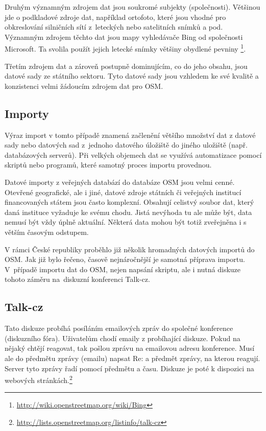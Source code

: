 Druhým významným zdrojem dat jsou soukromé subjekty (společnosti).
Většinou jde o podkladové zdroje dat, například ortofoto, které jsou
vhodné pro obkreslování silničních sítí z~leteckých nebo
satelitních snímků a pod.
Významným zdrojem těchto dat jsou mapy vyhledávače Bing od společnosti
Microsoft. Ta svolila použít jejich letecké snímky většiny
obydlené pevniny \footnote{\url{http://wiki.openstreetmap.org/wiki/Bing}}.

Třetím zdrojem dat a zároveň postupně dominujícím, co do jeho obsahu, jsou
datové sady ze státního sektoru. Tyto datové sady jsou vzhledem ke své kvalitě a konzistenci velmi žádoucím zdrojem
dat pro OSM.

\subsection{Importy}
\label{Importy}
Výraz import v tomto případě znamená začlenění většího množství dat z datové sady nebo datových sad
z~jednoho datového úložiště do jiného uložiště (např. databázových serverů). Při velkých objemech dat
se využívá automatizace pomocí skriptů nebo programů, které samotný proces importu provednou.

Datové importy z veřejných databází do databáze OSM jsou velmi cenné. 
Otevřené geografické, ale i jiné, datové zdroje státních či veřejných institucí 
financovaných státem jsou často komplexní. Obsahují celistvý
soubor dat, který daná instituce vyžaduje ke svému chodu. Jistá nevýhoda tu 
ale může být, data nemusí být vždy úplně aktuální. Některá data mohou 
být totiž zveřejněna i s větším časovým odstupem.

V rámci České republiky proběhlo již několik hromadných datových importů do OSM. Jak 
již bylo řečeno, časově nejnáročnější je samotná příprava importu.
V~případě importu dat do OSM, nejen napsání skriptu, ale i nutná diskuze tohoto záměru
na~diskuzní konferenci Talk-cz. 

\subsection{Talk-cz}
\label{Talk-cz}
Tato diskuze probíhá posíláním emailových zpráv do společné konference (diskuzního fóra). 
Uživatelům chodí emaily z probíhající diskuze. Pokud na nějaký
chtějí reagovat, tak pošlou zprávu na emailovou adresu konference. Musí ale do předmětu zprávy (emailu) napsat Re: a předmět zprávy, na kterou reagují.
Server tyto zprávy řadí pomocí 
předmětu a času. Diskuze je poté k dispozici na webových stránkách.\footnote{\url{http://lists.openstreetmap.org/listinfo/talk-cz}}


